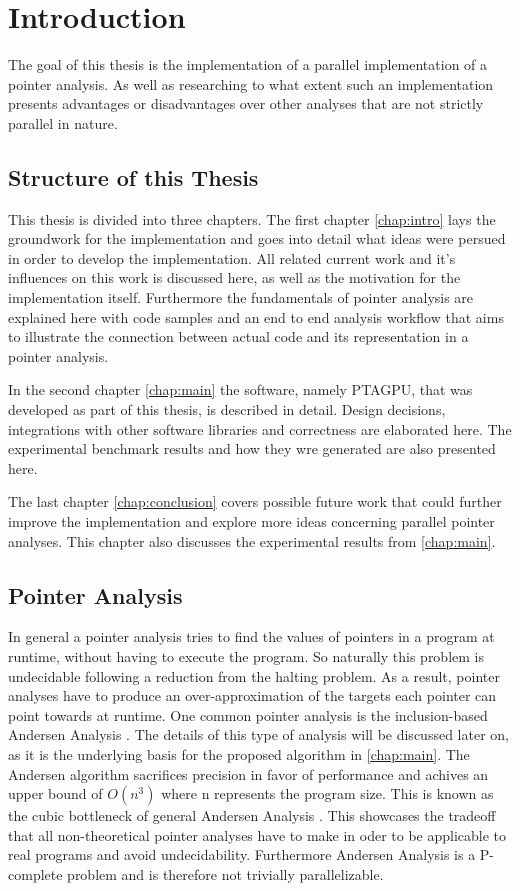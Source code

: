 \chapter{Introduction} \label{chap:intro}
The goal of this thesis is the implementation of a parallel implementation of a pointer analysis. As well as researching to what extent such an implementation presents advantages or disadvantages over other analyses that are not strictly parallel in nature.

\section{Structure of this Thesis}
This thesis is divided into three chapters.
The first chapter \autoref{chap:intro} lays the groundwork for the implementation and goes into detail what ideas were persued in order to develop the implementation. All related current work and it's influences on this work is discussed here, as well as the motivation for the implementation itself. Furthermore the fundamentals of pointer analysis are explained here with code samples and an end to end analysis workflow that aims to illustrate the connection between actual code and its representation in a pointer analysis.

In the second chapter \autoref{chap:main} the software, namely PTAGPU, that was developed as part of this thesis, is described in detail. Design decisions, integrations with other software libraries and correctness are elaborated here.
The experimental benchmark results and how they wre generated are also presented here.

The last chapter \autoref{chap:conclusion} covers possible future work that could further improve the implementation and explore more ideas concerning parallel pointer analyses.
This chapter also discusses the experimental results from \autoref{chap:main}.


\section{Pointer Analysis}
In general a pointer analysis tries to find the values of pointers in a program at runtime, without having to execute the program.
So naturally this problem is undecidable \cite{landi1992undecidability} following a reduction from the halting problem.
As a result, pointer analyses have to produce an over-approximation of the targets each pointer can point towards at runtime.
One common pointer analysis is the inclusion-based Andersen Analysis \cite{andersen1994program}. The details of this type of analysis will be discussed later on, as it is the underlying basis for the proposed algorithm in \autoref{chap:main}. The Andersen algorithm sacrifices precision in favor of performance and achives an upper bound of $O(n^3)$ where n represents the program size. This is known as the cubic bottleneck of general Andersen Analysis \cite{mathiasen2021fine}.
This showcases the tradeoff that all non-theoretical pointer analyses have to make in oder to be applicable to real programs and avoid undecidability. Furthermore Andersen Analysis is a P-complete problem and is therefore not trivially parallelizable.

